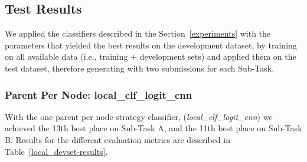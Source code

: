 \documentclass[11pt,a4paper]{article}
\begin{document}
\begin{comment}

classifier			tokenisation schema
[[256, 10], [256, 7], [256, 5], [256, 3], [256, 2], [256, 1]]			low	TRUE
kernel_initializer=random_uniform			simple	TRUE
de-wiki-fasttext-300d-1M			stopwords	TRUE
dropout_p = 0.5
fully_connected_layers=2
adam
batch_size=128,
shuffle=True,
validation_split=0.4,
verbose=1,
epochs=500
filtered = np.array(len(labels2idx) * [0.4])

subtask_a			subtask_b
Precision	0.7875		Precision	0.6235
Recall	0.7942		Recall	0.5066
F1	0.7908		F1	0.559
\begin{comment}


\begin{comment}
[[256, 10], [256, 7], [256, 5], [256, 3], [256, 2], [256, 1]]
dropout_p = 0.5
fully_connected_layers=2
adam
batch_size=128,
shuffle=True,
epochs=250

subtask_a			subtask_b
Precision	0.3355		Precision	0.2381
Recall	0.6256		Recall	0.3057
F1	0.4368		F1	0.2677
\end{comment}





\subsection{Test Results}

We applied the classifiers described in the Section~\ref{experiments} with the
parameters that yielded the best results on the development dataset, by training
on all available data (i.e., training + development sets) and applied them
on the test dataset, therefore generating with two submissions for each Sub-Task.

\subsubsection{Parent Per Node: local\_clf\_logit\_cnn}

With the one parent per node strategy classifier, (\textit{local\_clf\_logit\_cnn})
we achieved the 13th best place on Sub-Task A, and the 11th best place on
Sub-Task B. Results for the different evaluation metrics are described in
Table~\ref{local_devset-results}.
\end{document}

